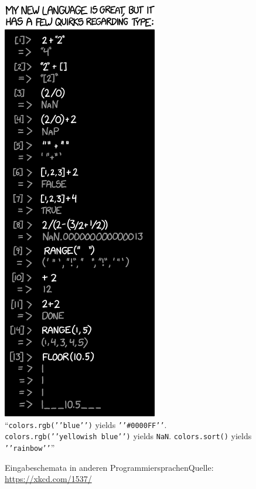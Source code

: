 \begin{figure}
	\centering
	\includegraphics[width=.3\linewidth]{./gfx/xkcd-types} \\
	\enquote{\texttt{colors.rgb('{}'blue'{}')} yields \texttt{'{}'\#0000FF'{}'}.
	 \texttt{colors.rgb('{}'yellowish blue'{}')} yields \texttt{NaN}. 
	 \texttt{colors.sort()} yields \texttt{'{}'rainbow'{}'}}
	\caption[Eingabeschemata in anderen Programmiersprachen]{Eingabeschemata in anderen Programmiersprachen\newline Quelle: \url{https://xkcd.com/1537/}}
\end{figure}